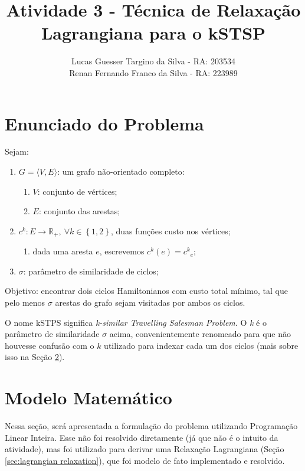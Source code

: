 \documentclass{article}
\title{Atividade 3 - Técnica de Relaxação Lagrangiana para o kSTSP}
\author{
	Lucas Guesser Targino da Silva - RA: 203534 \\
    Renan Fernando Franco da Silva - RA: 223989
}
\newcommand{\secref}[1]{(Seção \ref{#1})}
\newcommand{\Set}[1]{\ensuremath{\left\{#1\right\}}}
\newcommand{\edge}{\ensuremath{e}}
\newcommand{\edges}{\ensuremath{E}}
\newcommand{\vertices}{\ensuremath{V}}
\newcommand{\ncycles}{2}
\newcommand{\allCycles}{\ensuremath{\Set{1, \ncycles}}}
\newcommand{\cycle}{\ensuremath{k}}
\newcommand{\graph}{\ensuremath{G}}
\newcommand{\cost}[1]{\ensuremath{c^{#1}}}
\newcommand{\costk}{\ensuremath{\cost{\cycle}}}
\newcommand{\costke}{\ensuremath{\cost{\cycle}_{\edge}}}
\newcommand{\positiveReal}{\ensuremath{\mathbb{R}_+}}
\newcommand{\similarity}{\ensuremath{\sigma}}
\begin{document}
\maketitle

\section{Enunciado do Problema}

Sejam:

\begin{enumerate}
    \item $\graph = \langle \vertices,\edges \rangle$: um grafo não-orientado completo:
    \begin{enumerate}
        \item $\vertices$: conjunto de vértices;
        \item $\edges$: conjunto das arestas;
    \end{enumerate}
    \item $\costk: \edges \rightarrow \positiveReal,\ \forall \cycle \in \allCycles$, duas funções custo nos vértices;
        \begin{enumerate}
            \item dada uma aresta $\edge$, escrevemos $\costk(\edge) = \costke$;
        \end{enumerate}
    \item $\similarity$: parâmetro de similaridade de ciclos;
\end{enumerate}

Objetivo: encontrar dois ciclos Hamiltonianos com custo total mínimo, tal que pelo menos $\similarity$ arestas do grafo sejam visitadas por ambos os ciclos.

O nome kSTPS significa \textit{k-similar Travelling Salesman Problem}. O \textit{k} é o parâmetro de similaridade $\similarity$ acima, convenientemente renomeado para que não houvesse confusão com o $\cycle$ utilizado para indexar cada um dos ciclos (mais sobre isso na Seção \ref{sec:mathematical model}).

\section{Modelo Matemático}
\label{sec:mathematical model}

Nessa seção, será apresentada a formulação do problema utilizando Programação Linear Inteira. Esse não foi resolvido diretamente (já que não é o intuito da atividade), mas foi utilizado para derivar uma Relaxação Lagrangiana \secref{sec:lagrangian relaxation}, que foi modelo de fato implementado e resolvido.
\end{document}
